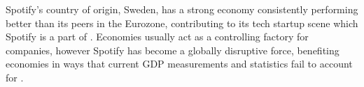 \par
Spotify's country of origin, Sweden, has a strong economy consistently performing better than its peers in the Eurozone, contributing to its tech startup scene which Spotify is a part of \parencite{sweden_beating}. Economies usually act as a controlling factory for companies, however Spotify has become a globally disruptive force, benefiting economies in ways that current GDP measurements and statistics fail to account for \parencite{uber_effect}.